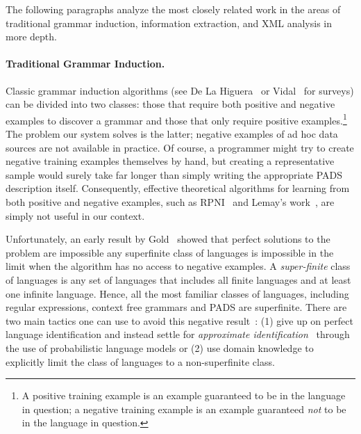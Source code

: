 \noindent
The following paragraphs analyze
the most closely related work in the areas of
traditional grammar induction, information extraction, and XML analysis
in more depth.

\paragraph*{Traditional Grammar Induction.}
Classic grammar induction algorithms (see De La Higuera~\cite{higuera01current}
or Vidal~\cite{vidal:gisurvey} for surveys) can be divided into two classes:
those that require both positive and negative examples to discover a grammar
and those that only require positive examples.\footnote{A positive training
example is an example guaranteed to be in the language in question;
a negative training example is an example guaranteed {\em not} to be in the 
language in question.}  The problem our system solves is the latter; 
negative examples of ad hoc data sources are not available in practice.  
Of course, a programmer might try to create
negative training examples themselves by hand, but creating a representative
sample would surely take far longer than simply writing
the appropriate PADS description itself.  Consequently, effective theoretical
algorithms for learning from both positive and negative examples, such as
RPNI~\cite{rpni} and Lemay's work~\cite{lemay+:tree-transducers}, are 
simply not useful in our context.  

Unfortunately, an early result by Gold~\cite{gold:inference} 
showed that perfect solutions to the problem
are impossible any superfinite class of languages is 
impossible in the limit when the algorithm has no access to negative 
examples.  A {\em super-finite} class of languages is any set of languages
that includes all finite languages and at least one infinite language. Hence,
all the most familiar classes of languages, including regular expressions, 
context free grammars and PADS are superfinite.  There are two
main tactics one can use to avoid this negative result~\cite{vidal:gisurvey}:
(1) give up on perfect language identification and instead
settle for 
{\em approximate identification}~\cite{wharton:approximate-language-identification} through the use of probabilistic language
models or (2) use domain knowledge to explicitly limit the class of languages
to a non-superfinite class.  


